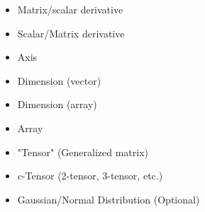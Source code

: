     \begin{itemize}
        \item Matrix/scalar derivative
        \item Scalar/Matrix derivative
        \item Axis
        \item Dimension (vector)
        \item Dimension (array)
        \item Array
        \item "Tensor" (Generalized matrix)
        \item $c$-Tensor (2-tensor, 3-tensor, etc.)
        \item Gaussian/Normal Distribution (Optional)
    \end{itemize}
        